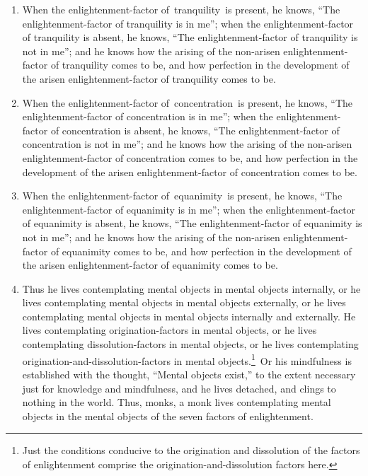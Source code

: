 \documentclass[a4 paper, 12pt]{article}
\begin{document}
\begin{enumerate}[resume]
\item When the enlightenment-factor of tranquility is present, he knows, “The enlightenment-factor of tranquility is in me”; when the enlightenment-factor of tranquility is absent, he knows, “The enlightenment-factor of tranquility is not in me”; and he knows how the arising of the non-arisen enlightenment-factor of tranquility comes to be, and how perfection in the development of the arisen enlightenment-factor of tranquility comes to be.
\item When the enlightenment-factor of concentration is present, he knows, “The enlightenment-factor of concentration is in me”; when the enlightenment-factor of concentration is absent, he knows, “The enlightenment-factor of concentration is not in me”; and he knows how the arising of the non-arisen enlightenment-factor of concentration comes to be, and how perfection in the development of the arisen enlightenment-factor of concentration comes to be.
\item When the enlightenment-factor of equanimity is present, he knows, “The enlightenment-factor of equanimity is in me”; when the enlightenment-factor of equanimity is absent, he knows, “The enlightenment-factor of equanimity is not in me”; and he knows how the arising of the non-arisen enlightenment-factor of equanimity comes to be, and how perfection in the development of the arisen enlightenment-factor of equanimity comes to be.
\item Thus he lives contemplating mental objects in mental objects internally, or he lives contemplating mental objects in mental objects externally, or he lives contemplating mental objects in mental objects internally and externally. He lives contemplating origination-factors in mental objects, or he lives contemplating dissolution-factors in mental objects, or he lives contemplating origination-and-dissolution-factors in mental objects.\footnote{Just the conditions conducive to the origination and dissolution of the factors of enlightenment comprise the origination-and-dissolution factors here.} Or his mindfulness is established with the thought, “Mental objects exist,” to the extent necessary just for knowledge and mindfulness, and he lives detached, and clings to nothing in the world. Thus, monks, a monk lives contemplating mental objects in the mental objects of the seven factors of enlightenment.
\end{enumerate}
\end{document}
